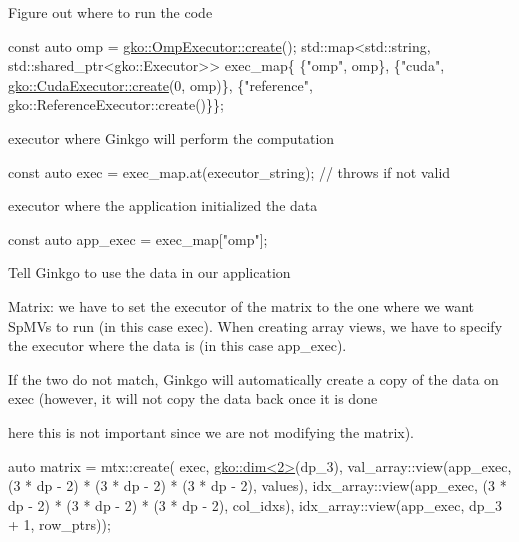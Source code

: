 Figure out where to run the code


\begin{DoxyCode}
\textcolor{keyword}{const} \textcolor{keyword}{auto} omp = \hyperlink{classgko_1_1OmpExecutor_a33ca05fdd0fc928ee262fc9425304874}{gko::OmpExecutor::create}();
std::map<std::string, std::shared\_ptr<gko::Executor>> exec\_map\{
    \{\textcolor{stringliteral}{"omp"}, omp\},
    \{\textcolor{stringliteral}{"cuda"}, \hyperlink{classgko_1_1CudaExecutor_a2718a92034350650ef406ffdb60db090}{gko::CudaExecutor::create}(0, omp)\},
    \{\textcolor{stringliteral}{"reference"}, gko::ReferenceExecutor::create()\}\};
\end{DoxyCode}


executor where Ginkgo will perform the computation


\begin{DoxyCode}
\textcolor{keyword}{const} \textcolor{keyword}{auto} exec = exec\_map.at(executor\_string);  \textcolor{comment}{// throws if not valid}
\end{DoxyCode}


executor where the application initialized the data


\begin{DoxyCode}
\textcolor{keyword}{const} \textcolor{keyword}{auto} app\_exec = exec\_map[\textcolor{stringliteral}{"omp"}];
\end{DoxyCode}


Tell Ginkgo to use the data in our application

Matrix\+: we have to set the executor of the matrix to the one where we want Sp\+M\+Vs to run (in this case {\ttfamily exec}). When creating array views, we have to specify the executor where the data is (in this case {\ttfamily app\+\_\+exec}).

If the two do not match, Ginkgo will automatically create a copy of the data on {\ttfamily exec} (however, it will not copy the data back once it is done
\begin{DoxyItemize}
\item here this is not important since we are not modifying the matrix).
\end{DoxyItemize}


\begin{DoxyCode}
\textcolor{keyword}{auto} matrix = mtx::create(
    exec, \hyperlink{structgko_1_1dim}{gko::dim<2>}(dp\_3),
    val\_array::view(app\_exec, (3 * dp - 2) * (3 * dp - 2) * (3 * dp - 2),
                    values),
    idx\_array::view(app\_exec, (3 * dp - 2) * (3 * dp - 2) * (3 * dp - 2),
                    col\_idxs),
    idx\_array::view(app\_exec, dp\_3 + 1, row\_ptrs));
\end{DoxyCode}


